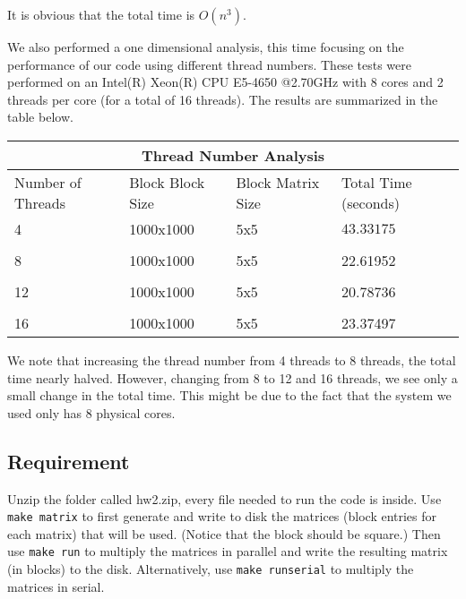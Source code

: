 \documentclass[12pt]{article}
\newcommand{\0}{\mathbf{0}}
\begin{document}
It is obvious that the total time is $O(n^3)$.
\bigskip

We also performed a one dimensional analysis, this time focusing on the performance of our code using different thread numbers. These tests were performed on an Intel(R) Xeon(R) CPU E5-4650 @2.70GHz with 8 cores and 2 threads per core (for a total of 16 threads). The results are summarized in the table below.

\begin{center}

    \begin{tabular}{ |p{2cm}| |p{2cm}| |p{2cm}||p{3cm}|}
	\hline
	\multicolumn{4}{|c|}{Thread Number Analysis} \\
	\hline
	Number of Threads& Block Block Size &Block Matrix Size & Total Time (seconds)  \\
	\hline
	4 & 1000x1000 &  5x5& $43.33175$   \\
	&  &  &  \\

	8& 1000x1000& 5x5 & 22.61952   \\ 

	& & &  \\

	12 & 1000x1000 & 5x5 & 20.78736  \\

	& & &  \\

	16 & 1000x1000 & 5x5 & 23.37497    \\


	\hline
    \end{tabular}

\end{center}

We note that increasing the thread number from 4 threads to 8 threads, the total time nearly halved. However, changing from 8 to 12 and 16 threads, we see only a small change in the total time. This might be due to the fact that the system we used only has 8 physical cores.
\subsection{Requirement}\label{requirement}

Unzip the folder called hw2.zip, every file needed to run the code is inside. Use \texttt{make matrix} to first generate and write to disk the matrices (block entries for each matrix) that will be used. (Notice that the block should be square.) Then use \texttt{make run} to multiply the matrices in parallel and write the resulting matrix (in blocks) to the disk. Alternatively, use \texttt{make runserial} to multiply the matrices in serial. 
\end{document}
